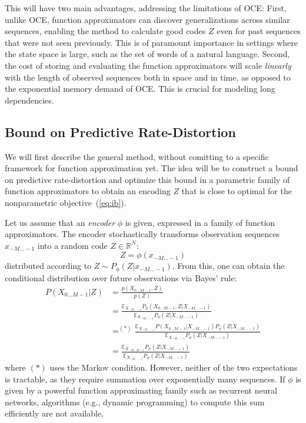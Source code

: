 \documentclass[11pt,letterpaper]{article}
\newcommand{\E}[0]{\mathbb{E}}
\begin{document}
This will have two main advantages, addressing the limitations of OCE:
First, unlike OCE, function approximators can discover generalizations across similar sequences, enabling the method to calculate good codes $Z$ even for past sequences that were not seen previously.
This is of paramount importance in settings where the state space is large, such as the set of words of a natural language.
Second, the cost of storing and evaluating the function approximators will scale \emph{linearly} with the length of observed sequences both in space and in time, as opposed to the exponential memory demand of OCE.
This is crucial for modeling long dependencies.

\subsection{Bound on Predictive Rate-Distortion}
We will first describe the general method, without comitting to a specific framework for function approximation yet.
The idea will be to construct a bound on predictive rate-distortion and optimize this bound in a parametric family of function approximators to obtain an encoding $Z$ that is close to optimal for the nonparametric objective~(\ref{eq:ib}).

Let us assume that an \emph{encoder} $\phi$ is given, expressed in a family of function approximators. 
The encoder stochastically transforms observation sequences $x_{-M\dots -1}$ into a random code $Z \in \mathbb{R}^N$: 
\begin{equation}
Z = \phi(x_{-M\dots -1})
\end{equation}
distributed according to $Z \sim P_\phi(Z|x_{-M\dots -1})$.
From this, one can obtain the conditional distribution over future observations via Bayes' rule: %
\begin{equation}
	\label{eq:cond-fut}
	\begin{split}
	P(X_{0\dots M-1}|Z) &= \frac{p(X_{0\dots M-1}, Z)}{p(Z)} \\
	&= \frac{\E_{X_{-M \dots -1}} P_\phi(X_{0\dots M-1}, Z|X_{-M\dots-1})}{\E_{X_{-M \dots -1}} P_\phi(Z|X_{-M \dots -1})} \\
	&=^{(*)} \frac{\E_{X_{-M \dots -1}}   P(X_{0\dots M-1}|X_{-M\dots-1})     P_\phi(Z|X_{-M\dots-1})}{\E_{X_{-M \dots -1}} P_\phi(Z|X_{-M \dots -1})} \\
	&= \frac{\E_{X_{-M \dots M-1}} P_\phi(Z|X_{-M\dots-1})}{\E_{X_{-M \dots -1}} P_\phi(Z|X_{-M \dots -1})}
	\end{split}
\end{equation}
where $(*)$ uses the Markov condition.
However, neither of the two expectations is tractable,  as they require summation over exponentially many sequences.
If $\phi$ is given by a powerful function approximating family such as recurrent neural networks, algorithms (e.g., dynamic programming) to compute this sum efficiently are not available.
\end{document}

